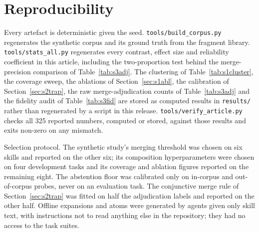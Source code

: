 \documentclass[11pt]{article}
\begin{document}
\appendix
\section{Reproducibility}

Every artefact is deterministic given the seed. \texttt{tools/build\_corpus.py} regenerates the
synthetic corpus and its ground truth from the fragment library. \texttt{tools/stats\_all.py}
regenerates every contrast, effect size and reliability coefficient in this article, including the
two-proportion test behind the merge-precision comparison of Table~\ref{tab:s3adj}. The clustering
of Table~\ref{tab:s1cluster}, the coverage sweep, the ablations of Section~\ref{sec:s1abl}, the
calibration of Section~\ref{sec:s2trap}, the raw merge-adjudication counts of Table~\ref{tab:s3adj}
and the fidelity audit of Table~\ref{tab:s3fid} are stored as computed results in \texttt{results/}
rather than regenerated by a script in this release. \texttt{tools/verify\_article.py} checks all
325 reported numbers, computed or stored, against those results and exits non-zero on any mismatch.

Selection protocol. The synthetic study's merging threshold was chosen on six skills and reported on
the other six; its composition hyperparameters were chosen on four development tasks and its
coverage and ablation figures reported on the remaining eight. The abstention floor was calibrated
only on in-corpus and out-of-corpus probes, never on an evaluation task. The conjunctive merge rule
of Section~\ref{sec:s2trap} was fitted on half the adjudication labels and reported on the other
half. Offline expansions and atoms were generated by agents given only skill text, with instructions
not to read anything else in the repository; they had no access to the task suites.
\end{document}
